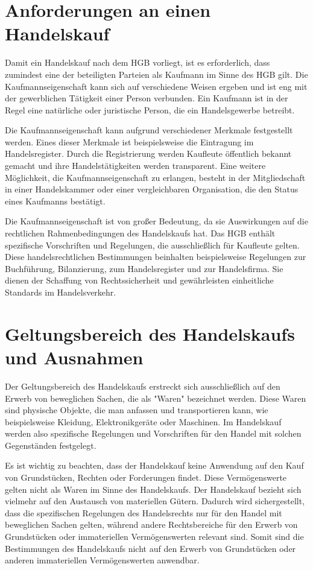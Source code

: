 \section{Anforderungen an einen Handelskauf}
Damit ein Handelskauf nach dem HGB vorliegt, ist es erforderlich, dass zumindest eine der beteiligten Parteien als Kaufmann im Sinne des HGB gilt. Die Kaufmannseigenschaft kann sich auf verschiedene Weisen ergeben und ist eng mit der gewerblichen Tätigkeit einer Person verbunden. Ein Kaufmann ist in der Regel eine natürliche oder juristische Person, die ein Handelsgewerbe betreibt.

Die Kaufmannseigenschaft kann aufgrund verschiedener Merkmale festgestellt werden. Eines dieser Merkmale ist beispielsweise die Eintragung im Handelsregister. Durch die Registrierung werden Kaufleute öffentlich bekannt gemacht und ihre Handelstätigkeiten werden transparent. Eine weitere Möglichkeit, die Kaufmannseigenschaft zu erlangen, besteht in der Mitgliedschaft in einer Handelskammer oder einer vergleichbaren Organisation, die den Status eines Kaufmanns bestätigt.

Die Kaufmannseigenschaft ist von großer Bedeutung, da sie Auswirkungen auf die rechtlichen Rahmenbedingungen des Handelskaufs hat. Das HGB enthält spezifische Vorschriften und Regelungen, die ausschließlich für Kaufleute gelten. Diese handelsrechtlichen Bestimmungen beinhalten beispielsweise Regelungen zur Buchführung, Bilanzierung, zum Handelsregister und zur Handelsfirma. Sie dienen der Schaffung von Rechtssicherheit und gewährleisten einheitliche Standards im Handelsverkehr.
\newpage\section{Geltungsbereich des Handelskaufs und Ausnahmen}
Der Geltungsbereich des Handelskaufs erstreckt sich ausschließlich auf den Erwerb von beweglichen Sachen, die als "Waren" bezeichnet werden. Diese Waren sind physische Objekte, die man anfassen und transportieren kann, wie beispielsweise Kleidung, Elektronikgeräte oder Maschinen. Im Handelskauf werden also spezifische Regelungen und Vorschriften für den Handel mit solchen Gegenständen festgelegt.

Es ist wichtig zu beachten, dass der Handelskauf keine Anwendung auf den Kauf von Grundstücken, Rechten oder Forderungen findet. Diese Vermögenswerte gelten nicht als Waren im Sinne des Handelskaufs. Der Handelskauf bezieht sich vielmehr auf den Austausch von materiellen Gütern. Dadurch wird sichergestellt, dass die spezifischen Regelungen des Handelsrechts nur für den Handel mit beweglichen Sachen gelten, während andere Rechtsbereiche für den Erwerb von Grundstücken oder immateriellen Vermögenswerten relevant sind. Somit sind die Bestimmungen des Handelskaufs nicht auf den Erwerb von Grundstücken oder anderen immateriellen Vermögenswerten anwendbar.
